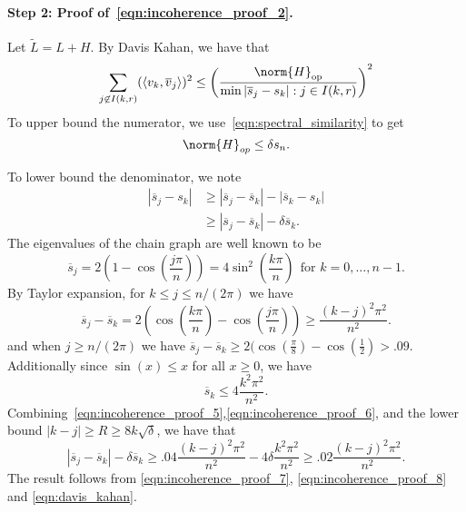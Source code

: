 \documentclass{article}
\newcommand{\abs}[1]{\left \lvert #1 \right \rvert}
\newcommand{\1}{\mathbf{1}}
\newcommand{\dotp}[2]{\langle #1, #2 \rangle}
\theoremstyle{alden}
\theoremstyle{aldenthm}
\theoremstyle{definition}
\theoremstyle{remark}
\begin{document}
\paragraph{Step 2: Proof of~\eqref{eqn:incoherence_proof_2}.}

Let $\widetilde{L} = L + H$. By Davis Kahan, we have that
\begin{equation}
\label{eqn:davis_kahan}
\sum_{j \not\in I(k,r)} (\dotp{v_k}{\overline{v}_j})^2 \leq \left(\frac{\norm{H}_{\textrm{op}}}{\min{\abs{\overline{s}_j - s_k}:j \in I(k,r)}}\right)^2
\end{equation}
To upper bound the numerator, we use~\eqref{eqn:spectral_similarity} to get
\begin{equation*}
\norm{H}_{op} \leq \delta s_{n}.
\end{equation*}

To lower bound the denominator, we note
\begin{align}
\abs{\overline{s}_j - s_k} & \geq \abs{\overline{s}_j - \overline{s}_k} - \abs{\overline{s}_k - s_k} \nonumber \\
& \geq \abs{\overline{s}_j - \overline{s}_k} - \delta \overline{s}_k. \label{eqn:incoherence_proof_8}
\end{align}
The eigenvalues of the chain graph are well known to be
\begin{equation*}
\overline{s}_j = 2\left(1 - \cos\left(\frac{j\pi}{n}\right)\right) = 4\sin^2\left(\frac{k\pi}{n}\right) ~~\textrm{for $k = 0,\ldots,n - 1$.}
\end{equation*}
By Taylor expansion, for $k \leq j \leq n/(2\pi)$ we have
\begin{equation}
\label{eqn:incoherence_proof_5}
\overline{s}_j - \overline{s}_k = 2\left(\cos\left(\frac{k\pi}{n}\right) - \cos\left(\frac{j\pi}{n}\right)\right) \geq \frac{(k - j)^2\pi^2}{n^2}.
\end{equation}
and when $j \geq n/(2\pi)$ we have $\overline{s}_j - \overline{s}_k \geq 2(\cos\left(\frac{\pi}{8}\right) - \cos\left(\frac{1}{2}\right) > .09$. Additionally since $\sin(x) \leq x$ for all $x \geq 0$, we have
\begin{equation}
\label{eqn:incoherence_proof_6}
\overline{s}_k \leq 4\frac{k^2\pi^2}{n^2}.
\end{equation}
Combining~\eqref{eqn:incoherence_proof_5},\eqref{eqn:incoherence_proof_6}, and the lower bound $\abs{k - j} \geq R \geq 8k\sqrt{\delta}$, we have that
\begin{equation}
\label{eqn:incoherence_proof_7}
\abs{\overline{s}_j - \overline{s}_k} - \delta \overline{s}_k \geq .04\frac{(k - j)^2\pi^2}{n^2} - 4 \delta\frac{k^2\pi^2}{n^2} \geq .02\frac{(k - j)^2\pi^2}{n^2}.
\end{equation}
The result follows from \eqref{eqn:incoherence_proof_7}, \eqref{eqn:incoherence_proof_8} and \eqref{eqn:davis_kahan}.
\end{document}
